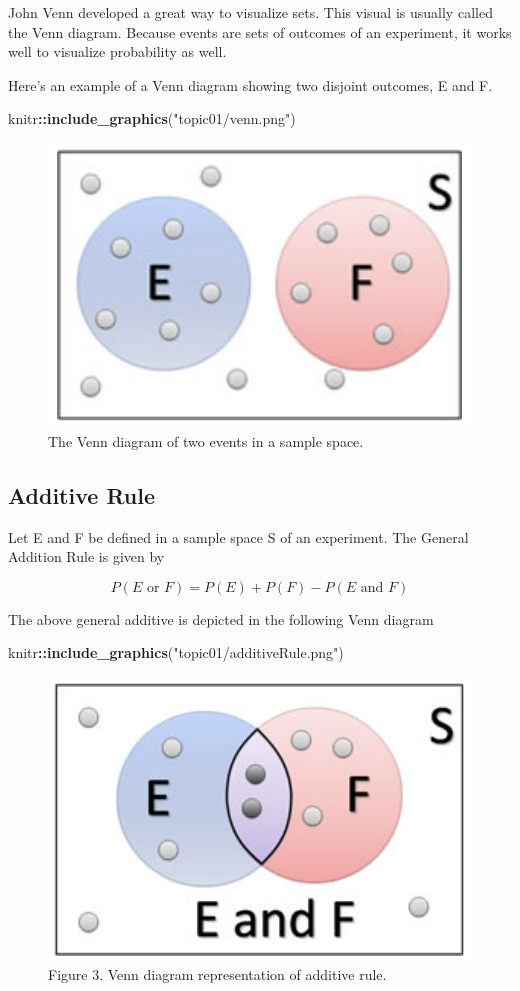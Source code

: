 \documentclass[
]{book}
\newenvironment{Shaded}{\begin{snugshade}}{\end{snugshade}}
\newcommand{\FunctionTok}[1]{\textcolor[rgb]{0.13,0.29,0.53}{\textbf{#1}}}
\newcommand{\NormalTok}[1]{#1}
\newcommand{\SpecialCharTok}[1]{\textcolor[rgb]{0.81,0.36,0.00}{\textbf{#1}}}
\newcommand{\StringTok}[1]{\textcolor[rgb]{0.31,0.60,0.02}{#1}}
\begin{document}
John Venn developed a great way to visualize sets. This visual is usually called the Venn diagram. Because events are sets of outcomes of an experiment, it works well to visualize probability as well.

Here's an example of a Venn diagram showing two disjoint outcomes, E and F.

\begin{Shaded}
\begin{Highlighting}[]
\NormalTok{knitr}\SpecialCharTok{::}\FunctionTok{include\_graphics}\NormalTok{(}\StringTok{"topic01/venn.png"}\NormalTok{)}
\end{Highlighting}
\end{Shaded}

\begin{figure}

{\centering \includegraphics[width=0.3\linewidth]{topic01/venn} 

}

\caption{The Venn diagram of two events in a sample space.}\label{fig:unnamed-chunk-22}
\end{figure}

\hypertarget{additive-rule}{%
\subsection{Additive Rule}\label{additive-rule}}

Let E and F be defined in a sample space S of an experiment. The General Addition Rule is given by

\[P(E \mbox{ or } F) = P(E) + P(F) - P(E \mbox{ and } F)\]

The above general additive is depicted in the following Venn diagram

\begin{Shaded}
\begin{Highlighting}[]
\NormalTok{knitr}\SpecialCharTok{::}\FunctionTok{include\_graphics}\NormalTok{(}\StringTok{"topic01/additiveRule.png"}\NormalTok{)}
\end{Highlighting}
\end{Shaded}

\begin{figure}

{\centering \includegraphics[width=0.3\linewidth]{topic01/additiveRule} 

}

\caption{Figure 3. Venn diagram representation of additive rule.}\label{fig:unnamed-chunk-23}
\end{figure}
\end{document}
